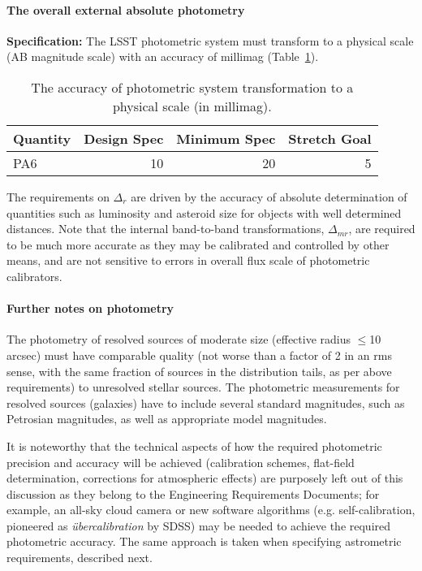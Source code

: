 \paragraph{The overall external absolute photometry\\}

\textbf{Specification:} The LSST photometric system must transform to a
physical scale (\eg AB magnitude scale) with an accuracy of
millimag (Table~\ref{ToffsetsAB}).

\begin{table}[h]
\begin{tabular}{|l|r|r|r|}
\hline
Quantity   & Design Spec  & Minimum Spec & Stretch Goal   \\
\hline
     PA6  &     10       &       20     &       5         \\
\hline
\end{tabular}
\caption{The accuracy of photometric system transformation to a physical scale
(in millimag). }
\label{ToffsetsAB}
\end{table}

The requirements on $\Delta_{r}$ are driven by the accuracy of absolute determination of
quantities such as luminosity and asteroid size for objects with well
determined distances. Note that the internal band-to-band transformations,
$\Delta_{mr}$, are required to be much more accurate as they may be calibrated
and controlled by other means, and are not sensitive to errors in overall
flux scale of photometric calibrators.



\paragraph{Further notes on photometry\\}


The photometry of resolved sources of moderate size (effective radius $\le$10
arcsec) must
have comparable quality (not worse than a factor of 2 in an rms sense, with the
same fraction of sources in the distribution tails, as per above requirements)
to unresolved stellar sources. The photometric measurements for resolved sources
(galaxies) have to include several standard magnitudes, such as Petrosian magnitudes,
as well as appropriate model magnitudes.

It is noteworthy that the technical aspects of how the required photometric precision
and accuracy will be achieved (\eg calibration schemes,
flat-field determination, corrections for atmospheric effects) are purposely
left out of this discussion as they belong to the Engineering Requirements
Documents; for example, an all-sky cloud camera or new software algorithms
(e.g. self-calibration, pioneered as \textit{\"{u}bercalibration} by SDSS)
may be needed to achieve the required photometric accuracy. The same
approach is taken when specifying astrometric requirements, described next.



